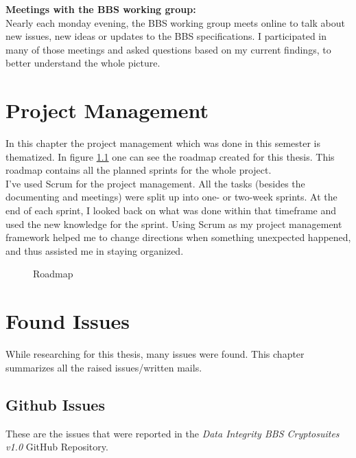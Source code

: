 \documentclass[
	a4paper               %
	,BCOR=0mm            %
	,bibliography=totoc   %
	,listof=totoc         %
	,monolingual
	,twoside=false
]{bfhthesis}              %
\begin{document}
\noindent
\textbf{Meetings with the BBS working group:}\\
Nearly each monday evening, the BBS working group meets online to talk about new issues, new ideas or updates to the BBS specifications. I participated in many of those meetings and asked questions based on my current findings, to better understand the whole picture.


\chapter{Project Management}
In this chapter the project management which was done in this semester is thematized.
In figure \ref{fig:roadmap} one can see the roadmap created for this thesis. This roadmap contains all the planned sprints for the whole project.\\

I've used Scrum for the project management. All the tasks (besides the documenting and meetings) were split up into one- or two-week sprints. At the end of each sprint, I looked back on what was done within that timeframe and used the new knowledge for the sprint. Using Scrum as my project management framework helped me to change directions when something unexpected happened, and thus assisted me in staying organized.

\newpage
\begin{figure}[h]
	\centering
	\label{fig:roadmap}
	\caption{Roadmap}
\end{figure}


\chapter{Found Issues}
While researching for this thesis, many issues were found. This chapter summarizes all the raised issues/written mails.

\section{Github Issues}
These are the issues that were reported in the \textit{Data Integrity BBS Cryptosuites v1.0}\cite{bbsvc} GitHub Repository.\\
\end{document}
